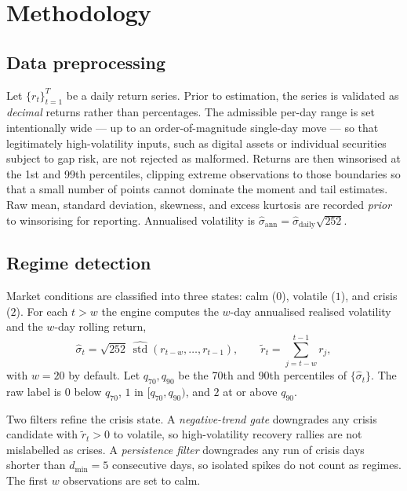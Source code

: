 \documentclass[11pt]{article}
\theoremstyle{definition}
\begin{document}
\section{Methodology}
\label{sec:method}

\subsection{Data preprocessing}
Let $\{r_t\}_{t=1}^T$ be a daily return series. Prior to estimation, the series is
validated as \emph{decimal} returns rather than percentages. The admissible
per-day range is set intentionally wide --- up to an order-of-magnitude single-day
move --- so that legitimately high-volatility inputs, such as digital assets or
individual securities subject to gap risk, are not rejected as malformed. Returns
are then winsorised at the 1st and 99th percentiles, clipping extreme observations
to those boundaries so that a small number of points cannot dominate the moment
and tail estimates. Raw mean, standard deviation, skewness, and excess kurtosis
are recorded \emph{prior} to winsorising for reporting. Annualised volatility is
$\hat\sigma_{\text{ann}} = \hat\sigma_{\text{daily}}\sqrt{252}$.

\subsection{Regime detection}
\label{sec:regime}
Market conditions are classified into three states: calm ($0$), volatile ($1$),
and crisis ($2$). For each $t>w$ the engine computes the $w$-day annualised
realised volatility and the $w$-day rolling return,
\begin{equation}
  \hat\sigma_t = \sqrt{252}\,\widehat{\operatorname{std}}(r_{t-w},\dots,r_{t-1}),
  \qquad
  \tilde r_t = \sum_{j=t-w}^{t-1} r_j,
\end{equation}
with $w=20$ by default. Let $q_{70},q_{90}$ be the 70th and 90th percentiles of
$\{\hat\sigma_t\}$. The raw label is $0$ below $q_{70}$, $1$ in $[q_{70},q_{90})$,
and $2$ at or above $q_{90}$.

Two filters refine the crisis state. A \emph{negative-trend gate} downgrades any
crisis candidate with $\tilde r_t > 0$ to volatile, so high-volatility recovery
rallies are not mislabelled as crises. A \emph{persistence filter} downgrades any
run of crisis days shorter than $d_{\min}=5$ consecutive days, so isolated spikes
do not count as regimes. The first $w$ observations are set to calm.
\end{document}
